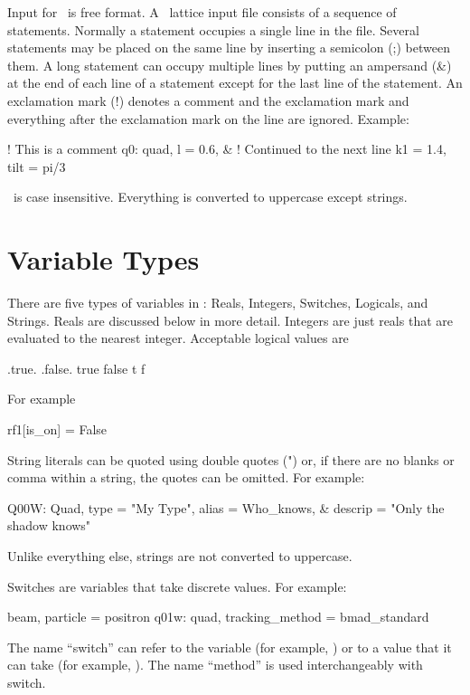 Input for \bmad\ is free format. A \bmad\ lattice input file consists
of a sequence of statements. Normally a statement occupies a single
line in the file. Several statements may be placed on the same line by
inserting a semicolon (;) between them. A long statement can occupy
multiple lines by putting an ampersand (\&) at the end of each line of
a statement except for the last line of the statement. An
exclamation mark (!) denotes a comment and the exclamation mark and
everything after the exclamation mark on the line are ignored. Example:
\begin{example}
  ! This is a comment
  q0: quad, l = 0.6, &     ! Continued to the next line
            k1 = 1.4, tilt = pi/3
\end{example}
\bmad\ is case insensitive. Everything is converted to uppercase except
strings.

\section{Variable Types}

There are five types of variables in \bmad: Reals, Integers, Switches, 
Logicals, and 
Strings. Reals are discussed below in more detail. Integers are just reals
that are evaluated to the nearest integer. Acceptable logical values are
\begin{example}
  .true.  .false.
   true    false
   t       f
\end{example}
For example
\begin{example}
  rf1[is_on] = False
\end{example}

\vskip0.1in
String literals can be quoted using double quotes (") or, if there are no
blanks or comma within a string, the quotes can be omitted. For example:
\begin{example}
  Q00W: Quad, type = "My Type", alias = Who_knows, &
                                  descrip = "Only the shadow knows"
\end{example}
Unlike everything else, strings are not converted to uppercase.

Switches are variables that take discrete values. For example:
\begin{example}
  beam, particle = positron                    
  q01w: quad, tracking\_method = bmad\_standard 
\end{example}
The name ``switch'' can refer to the variable (for example,
) or to a value that it can take (for example,
). The name ``method'' is used interchangeably with switch.

